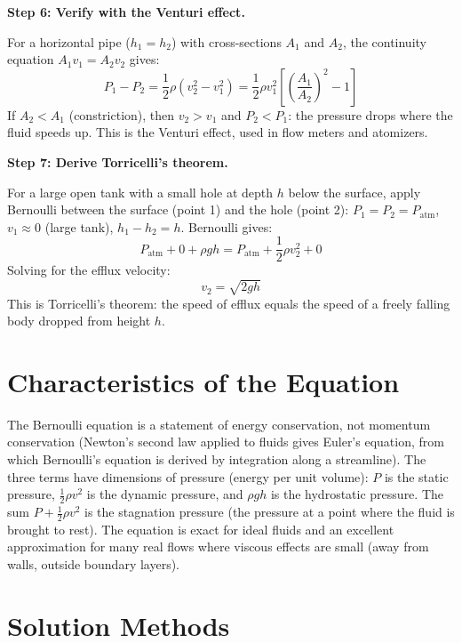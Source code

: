 \documentclass[11pt,openright]{book}
\begin{document}
\textbf{Step 6: Verify with the Venturi effect.}

For a horizontal pipe ($h_1 = h_2$) with cross-sections $A_1$ and $A_2$, the continuity equation $A_1 v_1 = A_2 v_2$ gives:
\begin{equation}
P_1 - P_2 = \frac{1}{2}\rho(v_2^2 - v_1^2) = \frac{1}{2}\rho v_1^2\left[\left(\frac{A_1}{A_2}\right)^2 - 1\right]
\end{equation}
If $A_2 < A_1$ (constriction), then $v_2 > v_1$ and $P_2 < P_1$: the pressure drops where the fluid speeds up. This is the Venturi effect, used in flow meters and atomizers.

\textbf{Step 7: Derive Torricelli's theorem.}

For a large open tank with a small hole at depth $h$ below the surface, apply Bernoulli between the surface (point 1) and the hole (point 2): $P_1 = P_2 = P_{\text{atm}}$, $v_1 \approx 0$ (large tank), $h_1 - h_2 = h$. Bernoulli gives:
\begin{equation}
P_{\text{atm}} + 0 + \rho gh = P_{\text{atm}} + \frac{1}{2}\rho v_2^2 + 0
\end{equation}
Solving for the efflux velocity:
\begin{equation}
v_2 = \sqrt{2gh}
\end{equation}
This is Torricelli's theorem: the speed of efflux equals the speed of a freely falling body dropped from height $h$.

\section*{Characteristics of the Equation}

The Bernoulli equation is a statement of energy conservation, not momentum conservation (Newton's second law applied to fluids gives Euler's equation, from which Bernoulli's equation is derived by integration along a streamline). The three terms have dimensions of pressure (energy per unit volume): $P$ is the static pressure, $\frac{1}{2}\rho v^2$ is the dynamic pressure, and $\rho gh$ is the hydrostatic pressure. The sum $P + \frac{1}{2}\rho v^2$ is the stagnation pressure (the pressure at a point where the fluid is brought to rest). The equation is exact for ideal fluids and an excellent approximation for many real flows where viscous effects are small (away from walls, outside boundary layers).
\section*{Solution Methods}
\end{document}
